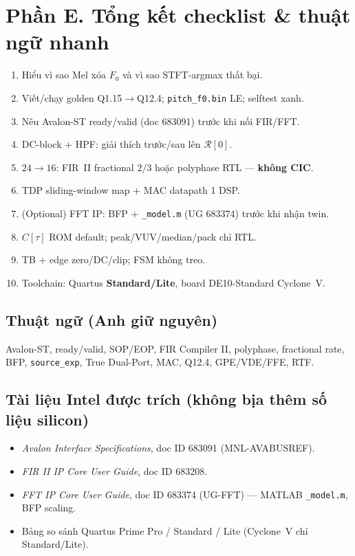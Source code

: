 
\section*{Phần E. Tổng kết checklist \& thuật ngữ nhanh}

\begin{verifygate}
\begin{enumerate}[itemsep=2pt]
  \item Hiểu vì sao Mel xóa $F_0$ và vì sao STFT-argmax thất bại.
  \item Viết/chạy golden Q1.15$\to$Q12.4; \texttt{pitch\_f0.bin} LE; selftest xanh.
  \item Nêu Avalon-ST ready/valid (doc 683091) trước khi nối FIR/FFT.
  \item DC-block + HPF: giải thích trước/sau lên $\mathcal{R}[0]$.
  \item $24\to16$: FIR~II fractional $2/3$ hoặc polyphase RTL --- \textbf{không CIC}.
  \item TDP sliding-window map + MAC datapath 1 DSP.
  \item (Optional) FFT IP: BFP + \texttt{\_model.m} (UG 683374) trước khi nhận twin.
  \item $C[\tau]$ ROM default; peak/VUV/median/pack chỉ RTL.
  \item TB + edge zero/DC/clip; FSM không treo.
  \item Toolchain: Quartus \textbf{Standard/Lite}, board DE10-Standard Cyclone~V.
\end{enumerate}
\end{verifygate}

\subsection*{Thuật ngữ (Anh giữ nguyên)}
Avalon-ST, ready/valid, SOP/EOP, FIR Compiler II, polyphase, fractional rate, BFP, \texttt{source\_exp}, True Dual-Port, MAC, Q12.4, GPE/VDE/FFE, RTF.

\subsection*{Tài liệu Intel được trích (không bịa thêm số liệu silicon)}
\begin{itemize}[leftmargin=*,itemsep=1pt]
  \item \emph{Avalon Interface Specifications}, doc ID 683091 (MNL-AVABUSREF).
  \item \emph{FIR II IP Core User Guide}, doc ID 683208.
  \item \emph{FFT IP Core User Guide}, doc ID 683374 (UG-FFT) --- MATLAB \texttt{\_model.m}, BFP scaling.
  \item Bảng so sánh Quartus Prime Pro / Standard / Lite (Cyclone~V chỉ Standard/Lite).
\end{itemize}


